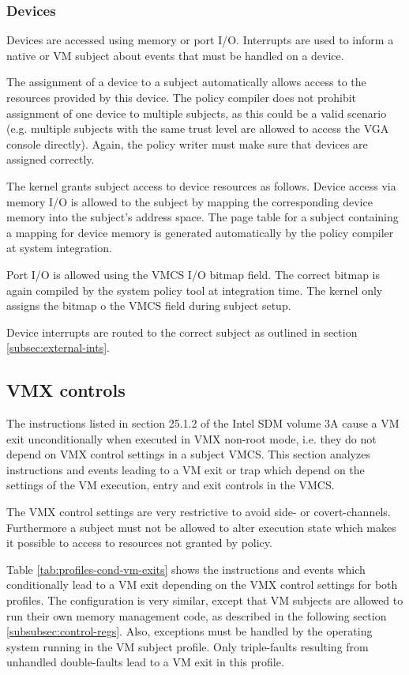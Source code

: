 \subsubsection{Devices}
Devices are accessed using memory or port I/O. Interrupts are used to inform a
native or VM subject about events that must be handled on a device.

The assignment of a device to a subject automatically allows access to the
resources provided by this device. The policy compiler does not prohibit
assignment of one device to multiple subjects, as this could be a valid scenario
(e.g.  multiple subjects with the same trust level are allowed to access the VGA
console directly). Again, the policy writer must make sure that devices are
assigned correctly.

The kernel grants subject access to device resources as follows. Device access
via memory I/O is allowed to the subject by mapping the corresponding device
memory into the subject's address space. The page table for a subject containing
a mapping for device memory is generated automatically by the policy compiler at
system integration.

Port I/O is allowed using the VMCS I/O bitmap field. The correct bitmap is again
compiled by the system policy tool at integration time. The kernel only assigns
the bitmap o the VMCS field during subject setup.

Device interrupts are routed to the correct subject as outlined in section
\ref{subsec:external-ints}.

\subsection{VMX controls}\label{subsec:vmx-controls}
The instructions listed in section 25.1.2 of the Intel SDM volume 3A cause a VM
exit unconditionally when executed in VMX non-root mode, i.e. they do not depend
on VMX control settings in a subject VMCS. This section analyzes instructions
and events leading to a VM exit or trap which depend on the settings of the VM
execution, entry and exit controls in the VMCS.

The VMX control settings are very restrictive to avoid side- or covert-channels.
Furthermore a subject must not be allowed to alter execution state which makes
it possible to access to resources not granted by policy.

Table \ref{tab:profiles-cond-vm-exits} shows the instructions and events which
conditionally lead to a VM exit depending on the VMX control settings for both
profiles. The configuration is very similar, except that VM subjects are allowed
to run their own memory management code, as described in the following section
\ref{subsubsec:control-regs}. Also, exceptions must be handled by the operating
system running in the VM subject profile. Only triple-faults resulting from
unhandled double-faults lead to a VM exit in this profile.

